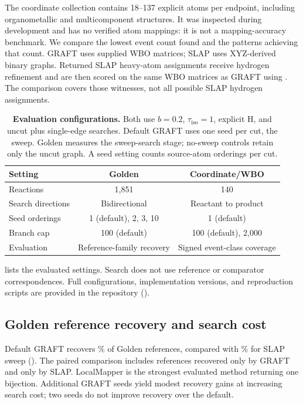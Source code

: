The coordinate collection contains 18--137 explicit atoms per endpoint, including organometallic and multicomponent structures. It was inspected during development and has no verified atom mappings: it is not a mapping-accuracy benchmark. We compare the lowest event count found and the patterns achieving that count. GRAFT uses supplied WBO matrices; SLAP uses XYZ-derived binary graphs. Returned SLAP heavy-atom assignments receive hydrogen refinement and are then scored on the same WBO matrices as GRAFT using . The comparison covers those witnesses, not all possible SLAP hydrogen assignments.

\begin{table}[tb]
\centering\small
\caption{\textbf{Evaluation configurations.} Both use $b=0.2$, $\tau_{\mathrm{iso}}=1$, explicit H, and uncut plus single-edge searches. Default GRAFT uses one seed per cut, the sweep. Golden measures the sweep-search stage; no-sweep controls retain only the uncut graph. A seed setting counts source-atom orderings per cut.}
\label{tab:protocol}
\begin{tabular}{lcc}\toprule
Setting & Golden & Coordinate/WBO\\\midrule
Reactions & 1,851 & 140\\
Search directions & Bidirectional & Reactant to product\\
Seed orderings & 1 (default), 2, 3, 10 & 1 (default)\\
Branch cap & 100 (default) & 100 (default), 2,000\\
Evaluation & Reference-family recovery & Signed event-class coverage\\\bottomrule
\end{tabular}
\end{table}

 lists the evaluated settings. Search does not use reference or comparator correspondences. Full configurations, implementation versions, and reproduction scripts are provided in the repository ().

\subsection{Golden reference recovery and search cost}

Default GRAFT recovers \GoldenOnePercent\% of Golden references, compared with \SlapPercent\% for SLAP sweep (). The paired comparison includes \AamOnly{} references recovered only by GRAFT and \SlapOnly{} only by SLAP. LocalMapper is the strongest evaluated method returning one bijection. Additional GRAFT seeds yield modest recovery gains at increasing search cost; two seeds do not improve recovery over the default.


